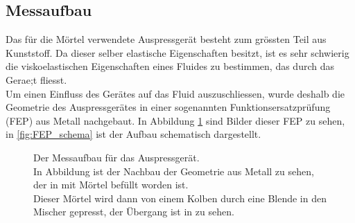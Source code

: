 \subsection{Messaufbau}
Das für die Mörtel verwendete Auspressgerät besteht zum grössten Teil aus Kunststoff. Da dieser selber elastische Eigenschaften besitzt, ist es sehr schwierig die viskoelastischen Eigenschaften eines Fluides zu bestimmen, das durch das Gerae;t fliesst.\\
Um einen Einfluss des Gerätes auf das Fluid auszuschliessen, wurde deshalb die Geometrie des Auspressgerätes in einer sogenannten Funktionsersatzprüfung (FEP) aus Metall nachgebaut. In Abbildung \ref{fig:FEP} sind Bilder dieser FEP zu sehen, in \ref{fig:FEP_schema} ist der Aufbau schematisch dargestellt.
%
\begin{figure}
    \centering
    \caption{Der Messaufbau für das Auspressgerät.\\In Abbildung  ist der Nachbau der Geometrie aus Metall zu sehen, der in  mit Mörtel befüllt worden ist.\\
    Dieser Mörtel wird dann von einem Kolben durch eine Blende in den Mischer gepresst, der Übergang ist in  zu sehen.}
    \label{fig:FEP}
\end{figure}
